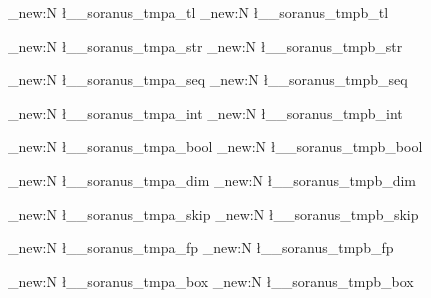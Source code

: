 %
%
%
% 
%



%

\tl_new:N \l__soranus_tmpa_tl
\tl_new:N \l__soranus_tmpb_tl

\str_new:N \l__soranus_tmpa_str
\str_new:N \l__soranus_tmpb_str

\seq_new:N \l__soranus_tmpa_seq
\seq_new:N \l__soranus_tmpb_seq

\int_new:N \l__soranus_tmpa_int
\int_new:N \l__soranus_tmpb_int

\bool_new:N \l__soranus_tmpa_bool
\bool_new:N \l__soranus_tmpb_bool

\dim_new:N \l__soranus_tmpa_dim
\dim_new:N \l__soranus_tmpb_dim

\skip_new:N \l__soranus_tmpa_skip
\skip_new:N \l__soranus_tmpb_skip

\fp_new:N \l__soranus_tmpa_fp
\fp_new:N \l__soranus_tmpb_fp

\box_new:N \l__soranus_tmpa_box
\box_new:N \l__soranus_tmpb_box



%
